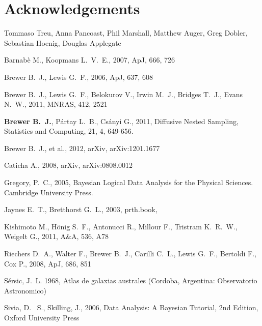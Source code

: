 \documentclass[letterpaper, 11pt]{article}
\begin{document}
\section*{Acknowledgements}
Tommaso Treu, Anna Pancoast, Phil Marshall, Matthew Auger, Greg Dobler, Sebastian Hoenig, Douglas Applegate


\begin{thebibliography}{99}
 Barnab{\`e} M., Koopmans L.~V.~E., 2007, ApJ, 666, 726 

 Brewer B.~J., Lewis G.~F., 2006, ApJ, 637, 608 

Brewer B.~J., Lewis G.~F., Belokurov V., Irwin M.~J., Bridges T.~J., Evans 
N.~W., 2011, MNRAS, 412, 2521 

 {\bf Brewer B.~J.}, P{\'a}rtay L.~B., Cs{\'a}nyi G., 2011, Diffusive Nested Sampling, 
Statistics and Computing, 21, 4, 649-656.

Brewer B.~J., et al., 2012, arXiv, arXiv:1201.1677 

Caticha A., 2008, arXiv, arXiv:0808.0012 

 Gregory, P.~C., 2005, 
Bayesian Logical Data Analysis for the Physical Sciences. Cambridge 
University Press.\ 

 Jaynes E.~T., Bretthorst G.~L., 2003, prth.book,  

 Kishimoto M., H{\"o}nig S.~F., Antonucci R., Millour F., Tristram K.~R.~W., Weigelt G., 2011, A\&A, 536, A78 

 Riechers D.~A., Walter F., Brewer B.~J., 
Carilli C.~L., Lewis G.~F., Bertoldi F., Cox P., 2008, ApJ, 686, 851 

{S{\'e}rsic}, J.~L. 1968, {Atlas de galaxias australes} (Cordoba, Argentina:
  Observatorio Astronomico)


 Sivia, 
D.~ S., Skilling, J., 2006, Data Analysis: A Bayesian Tutorial, 2nd 
Edition, Oxford University Press


\end{thebibliography}
\end{document}
